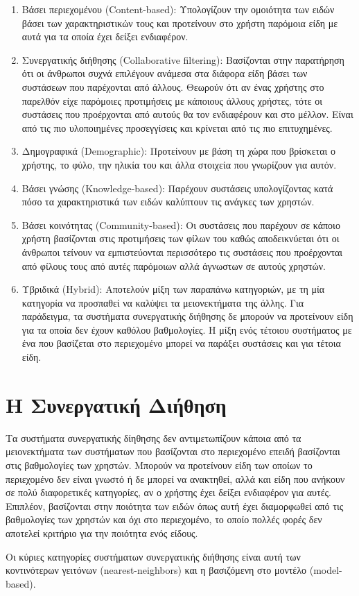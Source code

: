 \begin{enumerate}
 \item Βάσει περιεχομένου ({\en Content-based}): Υπολογίζουν την ομοιότητα των ειδών βάσει των χαρακτηριστικών τους και προτείνουν στο χρήστη παρόμοια είδη με αυτά για τα οποία έχει δείξει ενδιαφέρον.
 \item Συνεργατικής διήθησης ({\en Collaborative filtering}): Bασίζονται στην παρατήρηση ότι οι άνθρωποι συχνά επιλέγουν ανάμεσα στα διάφορα είδη βάσει των συστάσεων που παρέχονται από άλλους.  Θεωρούν ότι αν ένας χρήστης στο παρελθόν είχε παρόμοιες προτιμήσεις με κάποιους άλλους χρήστες, τότε οι συστάσεις που προέρχονται από αυτούς θα τον ενδιαφέρουν και στο μέλλον. Είναι από τις πιο υλοποιημένες προσεγγίσεις \cite{ricci2011recommender} και κρίνεται από τις πιο επιτυχημένες.\cite{Nikolakopoulos2015126}
 \item Δημογραφικά ({\en Demographic}): Προτείνουν με βάση τη χώρα που βρίσκεται ο χρήστης, το φύλο, την ηλικία του και άλλα στοιχεία που γνωρίζουν για αυτόν.
 \item Βάσει γνώσης ({\en Knowledge-based}): Παρέχουν συστάσεις υπολογίζοντας κατά πόσο τα χαρακτηριστικά των ειδών καλύπτουν τις ανάγκες των χρηστών.
 \item Βάσει κοινότητας ({\en Community-based}): Οι συστάσεις που παρέχουν σε κάποι\-ο χρήστη βασίζονται στις προτιμήσεις των φίλων του καθώς αποδεικνύεται ότι οι άνθρωποι τείνουν να εμπιστεύονται περισσότερο τις συστάσεις που προέρχονται από φίλους τους από αυτές παρόμοιων αλλά άγνωστων σε αυτούς χρηστών. \cite{conf/delos/SinhaS01}
 \item Υβριδικά ({\en Hybrid}): Αποτελούν μίξη των παραπάνω κατηγοριών, με τη μία κατηγορία να προσπαθεί να καλύψει τα μειονεκτήματα της άλλης. Για παράδειγμα, τα συστήματα συνεργατικής διήθησης δε μπορούν να προτείνουν είδη για τα οποία δεν έχουν καθόλου βαθμολογίες. Η μίξη ενός τέτοιου συστήματος με ένα που βασίζεται στο περιεχομένο μπορεί να παράξει συστάσεις και για τέτοια είδη. 
\end{enumerate} 
\section{Η Συνεργατική Διήθηση}
Τα συστήματα συνεργατικής δίηθησης δεν αντιμετωπίζουν κάποια από τα μειονεκτήματα των συστήματων που βασίζονται στο περιεχομένο επειδή βασίζονται στις βαθμολογίες των χρηστών. Μπορούν να προτείνουν είδη των οποίων το περιεχομένο δεν είναι γνωστό ή δε μπορεί να ανακτηθεί, αλλά και είδη που ανήκουν σε πολύ διαφορετικές κατηγορίες, αν ο χρήστης έχει δείξει ενδιαφέρον για αυτές. Επιπλέον, βασίζονται στην ποιότητα των ειδών όπως αυτή έχει διαμορφωθεί από τις βαθμολογίες των χρηστών και όχι στο περιεχομένο, το οποίο πολλές φορές δεν αποτελεί κριτήριο για την ποιότητα ενός είδους.\cite{ricci2011recommender} \par 
Οι κύριες κατηγορίες συστήματων συνεργατικής διήθησης είναι αυτή των κο\-ντινότερων γειτόνων ({\en nearest-neighbors}) και η βασιζόμενη στο μοντέλο ({\en model-based}). 
